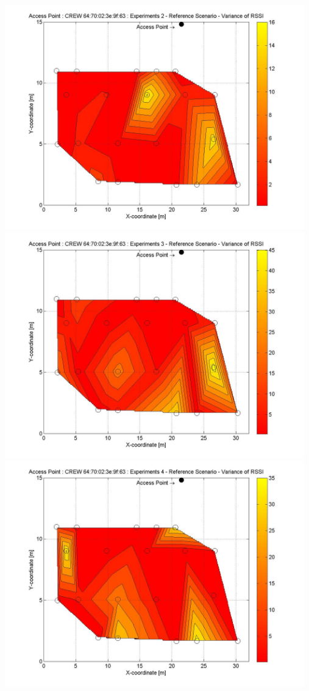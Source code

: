 \documentclass[11pt,a4paper,headinclude,footinclude,chapterprefix=on]{scrreprt}
\begin{document}
\begin{longtable}
	\includegraphics[width=13cm]{../../Source/plot/CREW_63/63_Ref_Ex_2_Variance.jpg} \\
	\includegraphics[width=13cm]{../../Source/plot/CREW_63/63_Ref_Ex_3_Variance.jpg} \\
	\includegraphics[width=13cm]{../../Source/plot/CREW_63/63_Ref_Ex_4_Variance.jpg} 
\end{longtable}
\end{document}
